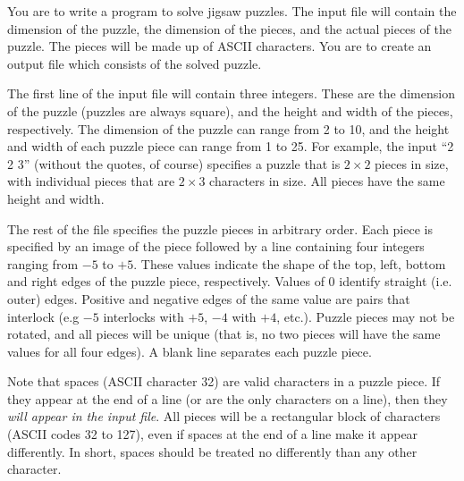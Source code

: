


\pagestyle{contest}


\maketitle


You are to write a program to solve jigsaw puzzles.  The input file
will contain the dimension of the puzzle, the dimension of the pieces,
and the actual pieces of the puzzle.  The pieces will be made up of
ASCII characters.  You are to create an output file which consists of
the solved puzzle.

\bigskip
{}

The first line of the input file will contain three integers.  These
are the dimension of the puzzle (puzzles are always square), and the
height and width of the pieces, respectively.  The dimension of the
puzzle can range from 2 to 10, and the height and width of each puzzle
piece can range from 1 to 25. For example, the input ``2 2 3''
(without the quotes, of course) specifies a puzzle that is $2\times2$
pieces in size, with individual pieces that are $2\times3$ characters
in size.  All pieces have the same height and width.

The rest of the file specifies the puzzle pieces in arbitrary order.
Each piece is specified by an image of the piece followed by a line
containing four integers ranging from $-5$ to $+5$.  These values
indicate the shape of the top, left, bottom and right edges of the
puzzle piece, respectively.  Values of 0 identify straight
(i.e. outer) edges.  Positive and negative edges of the same value are
pairs that interlock (e.g $-5$ interlocks with $+5$, $-4$ with $+4$,
etc.).  Puzzle pieces may not be rotated, and all pieces will be
unique (that is, no two pieces will have the same values for all four
edges).  A blank line separates each puzzle piece.

Note that spaces (ASCII character 32) are valid characters in a puzzle
piece.  If they appear at the end of a line (or are the only
characters on a line), then they {\em will appear in the input file}.
All pieces will be a rectangular block of characters (ASCII codes 32
to 127), even if spaces at the end of a line make it appear
differently.  In short, spaces should be treated no differently than
any other character.

